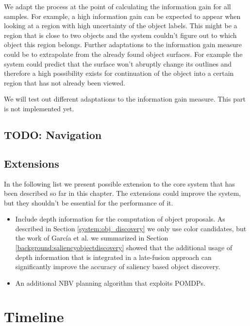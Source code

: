 \documentclass[a4paper,11pt,english]{article}
\begin{document}
We adapt the process at the point of calculating the information gain for all samples.
For example, a high information gain can be expected to appear when looking at a region with high uncertainty of the object labels.
This might be a region that is close to two objects and the system couldn't figure out to which object this region belongs.
Further adaptations to the information gain measure could be to extrapolate from the already found object surfaces. 
For example the system could predict that the surface won't abruptly change its outlines and therefore a high possibility exists for continuation of the object into a certain region that has not already been viewed.

We will test out different adaptations to the information gain measure. This part is not implemented yet.

\subsection{TODO: Navigation}
\label{system:navigation}
\subsection{Extensions}
\label{system:extensions}
In the following list we present possible extension to the core system that has been described so far in this chapter. 
The extensions could improve the system, but they shouldn't be essential for the performance of it.

\begin{itemize}
	\item Include depth information for the computation of object proposals.
	As described in Section \ref{system:obj_discovery} we only use color candidates, but the work of García et al. we summarized in Section \ref{background:saliencyobjectdiscovery} showed that the additional usage of depth information that is integrated in a late-fusion approach can significantly improve the accuracy of saliency based object discovery.
	\item An additional NBV planning algorithm that exploits POMDPs.
\end{itemize}

\section{Timeline}
\label{timeline}

\newpage


\end{document}
